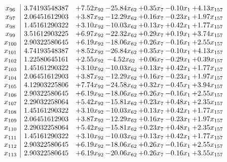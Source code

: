 \documentclass[8pt]{article}
\begin{document}
\[\begin{array}{c| c c@{\hskip 2pt} c@{\hskip 2pt} c@{\hskip 2pt} c@{\hskip 2pt} c@{\hskip 2pt} }
 x_{96}   &  3.74193548387 & +  7.52 x_{92} & -25.84 x_{62} & +  0.35 x_{7} & -0.10 x_{1} & +  4.13 x_{157}\\
 x_{97}   &  2.06451612903 & +  3.87 x_{92} & -12.29 x_{62} & +  0.16 x_{7} & -0.23 x_{1} & +  1.97 x_{157}\\
 x_{98}   &  1.45161290322 & +  3.10 x_{92} & -10.03 x_{62} & +  0.13 x_{7} & +  0.42 x_{1} & +  1.77 x_{157}\\
 x_{99}   &  3.51612903225 & +  6.97 x_{92} & -22.32 x_{62} & +  0.29 x_{7} & +  0.19 x_{1} & +  3.74 x_{157}\\
 x_{100}   &  2.90322580645 & +  6.19 x_{92} & -18.06 x_{62} & +  0.26 x_{7} & -0.16 x_{1} & +  2.55 x_{157}\\
 x_{101}   &  4.74193548387 & +  8.52 x_{92} & -26.84 x_{62} & +  0.35 x_{7} & -0.10 x_{1} & +  4.13 x_{157}\\
 x_{102}   &  1.22580645161 & +  2.55 x_{92} & -4.52 x_{62} & +  0.06 x_{7} & -0.29 x_{1} & +  0.39 x_{157}\\
 x_{103}   &  1.45161290322 & +  3.10 x_{92} & -10.03 x_{62} & +  0.13 x_{7} & +  0.42 x_{1} & +  1.77 x_{157}\\
 x_{104}   &  2.06451612903 & +  3.87 x_{92} & -12.29 x_{62} & +  0.16 x_{7} & -0.23 x_{1} & +  1.97 x_{157}\\
 x_{105}   &  4.12903225806 & +  7.74 x_{92} & -24.58 x_{62} & +  0.32 x_{7} & -0.45 x_{1} & +  3.94 x_{157}\\
 x_{106}   &  2.90322580645 & +  6.19 x_{92} & -18.06 x_{62} & +  0.26 x_{7} & -0.16 x_{1} & +  2.55 x_{157}\\
 x_{107}   &  2.29032258064 & +  5.42 x_{92} & -15.81 x_{62} & +  0.23 x_{7} & +  0.48 x_{1} & +  2.35 x_{157}\\
 x_{108}   &  1.45161290322 & +  3.10 x_{92} & -10.03 x_{62} & +  0.13 x_{7} & +  0.42 x_{1} & +  1.77 x_{157}\\
 x_{109}   &  2.06451612903 & +  3.87 x_{92} & -12.29 x_{62} & +  0.16 x_{7} & -0.23 x_{1} & +  1.97 x_{157}\\
 x_{110}   &  2.29032258064 & +  5.42 x_{92} & -15.81 x_{62} & +  0.23 x_{7} & +  0.48 x_{1} & +  2.35 x_{157}\\
 x_{111}   &  1.45161290322 & +  3.10 x_{92} & -10.03 x_{62} & +  0.13 x_{7} & +  0.42 x_{1} & +  1.77 x_{157}\\
 x_{112}   &  2.90322580645 & +  6.19 x_{92} & -18.06 x_{62} & +  0.26 x_{7} & -0.16 x_{1} & +  2.55 x_{157}\\
 x_{113}   &  2.90322580645 & +  6.19 x_{92} & -20.06 x_{62} & +  0.26 x_{7} & -0.16 x_{1} & +  3.55 x_{157}\\

\end{array}\]
\end{document}
